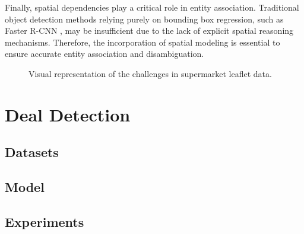 \documentclass[11pt]{article}
\begin{document}
Finally, spatial dependencies play a critical role in entity association. Traditional object detection methods relying purely on bounding box regression, such as Faster R-CNN \cite{ren2015faster}, may be insufficient due to the lack of explicit spatial reasoning mechanisms. Therefore, the incorporation of spatial modeling is essential to ensure accurate entity association and disambiguation.

\begin{figure}[ht]
    \centering
    \caption{Visual representation of the challenges in supermarket leaflet data.}
    \label{fig:leaflet_data}
\end{figure}


\section{Deal Detection}
    \subsection{Datasets}
    \subsection{Model}
    \subsection{Experiments}
\end{document}

